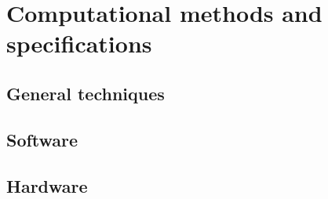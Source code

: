 \setchapterpreamble[u]{\margintoc}
\chapter{Computational methods and specifications}


\section{General techniques}

\blindtext


\section{Software}

\blindtext


\section{Hardware}

\blindtext

